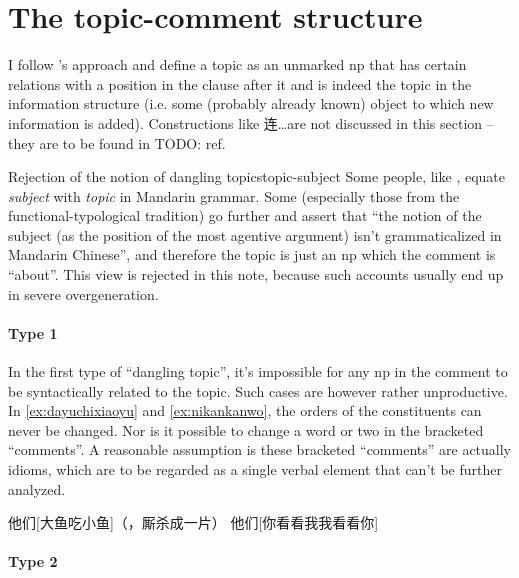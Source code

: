 \documentclass[UTF8, a4paper, oneside, scheme=plain]{ctexrep}
\newcommand*{\citesec}[1]{\S~{#1}}
\newcommand*{\term}[1]{\emph{#1}}
\begin{document}
\section{The topic-comment structure}

I follow \citet{sih2000topic}'s approach and define a topic as an unmarked \acs{np} 
that has certain relations with a position in the clause after it
and is indeed the topic in the information structure
(i.e. some (probably already known) object to which new information is added).
Constructions like 连\dots are not discussed in this section -- 
they are to be found in TODO: ref.

\begin{infobox}{Rejection of the notion of dangling topics}{topic-subject}
    Some people, like \citet[\citesec{7.1}]{zhudexigrammar},
    equate \term{subject} with \term{topic} in Mandarin grammar.
    Some (especially those from the functional-typological tradition) go further 
    and assert that ``the notion of the subject (as the position of the most agentive argument) 
    isn't grammaticalized in Mandarin Chinese'',
    and therefore the topic is just an \acs{np} which the comment is ``about''.
    This view is rejected in this note,
    because such accounts usually end up in severe overgeneration. 

    \paragraph*{Type 1} In the first type of ``dangling topic'',
    it's impossible for any \acs{np} in the comment to be syntactically related to the topic.
    Such cases are however rather unproductive. 
    In \eqref{ex:dayuchixiaoyu} and \eqref{ex:nikankanwo},
    the orders of the constituents can never be changed.
    Nor is it possible to change a word or two in the bracketed ``comments''.
    A reasonable assumption is these bracketed ``comments''
    are actually idioms, 
    which are to be regarded as a single verbal element that can't be further analyzed.

    \begin{exe}
        \ex\label{ex:dayuchixiaoyu} 他们[大鱼吃小鱼]（，厮杀成一片）
        \ex\label{ex:nikankanwo} 他们[你看看我我看看你]
    \end{exe}

    \paragraph*{Type 2} 
\end{infobox}
\end{document}

